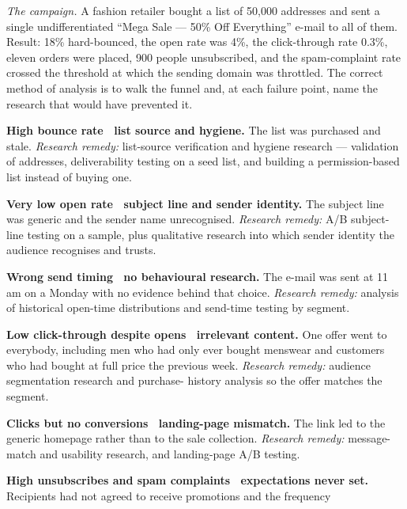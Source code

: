 \begin{qlist}
\textit{The campaign.} A fashion retailer bought a list of 50{,}000 addresses
and sent a single undifferentiated ``Mega Sale --- 50\% Off Everything'' e-mail
to all of them. Result: 18\% hard-bounced, the open rate was 4\%, the
click-through rate 0.3\%, eleven orders were placed, 900 people unsubscribed,
and the spam-complaint rate crossed the threshold at which the sending domain
was throttled. The correct method of analysis is to walk the funnel and, at
each failure point, name the research that would have prevented it.

\begin{apts}
\item \textbf{High bounce rate \ra\ list source and hygiene.} The list was
      purchased and stale. \emph{Research remedy:} list-source verification and
      hygiene research --- validation of addresses, deliverability testing on a
      seed list, and building a permission-based list instead of buying one.
\item \textbf{Very low open rate \ra\ subject line and sender identity.} The
      subject line was generic and the sender name unrecognised. \emph{Research
      remedy:} A/B subject-line testing on a sample, plus qualitative research
      into which sender identity the audience recognises and trusts.
\item \textbf{Wrong send timing \ra\ no behavioural research.} The e-mail was
      sent at 11 am on a Monday with no evidence behind that choice.
      \emph{Research remedy:} analysis of historical open-time distributions
      and send-time testing by segment.
\item \textbf{Low click-through despite opens \ra\ irrelevant content.} One
      offer went to everybody, including men who had only ever bought
      menswear and customers who had bought at full price the previous week.
      \emph{Research remedy:} audience segmentation research and purchase-
      history analysis so the offer matches the segment.
\item \textbf{Clicks but no conversions \ra\ landing-page mismatch.} The link
      led to the generic homepage rather than to the sale collection.
      \emph{Research remedy:} message-match and usability research, and
      landing-page A/B testing.
\item \textbf{High unsubscribes and spam complaints \ra\ expectations never
      set.} Recipients had not agreed to receive promotions and the frequency

\end{apts}
\end{qlist}
